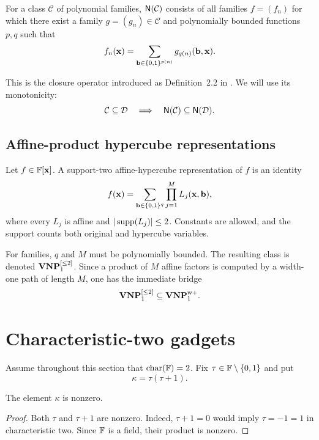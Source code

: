 \begin{definition}\label{def:nclosure}
For a class \(\mathcal C\) of polynomial families, \(\mathsf{N}(\mathcal C)\) consists of all
families \(f=(f_n)\) for which there exist a family \(g=(g_n)\in\mathcal C\) and
polynomially bounded functions \(p,q\) such that
\[
  f_n(\mathbf{x})
   =\sum_{\mathbf{b}\in\{0,1\}^{p(n)}}g_{q(n)}(\mathbf{b},\mathbf{x}).
\]
\end{definition}

This is the closure operator introduced as Definition~2.2 in
\cite{BringmannIkenmeyerZuiddam2018}.  We will use its monotonicity:
\[
  \mathcal C\subseteq\mathcal D
  \quad\Longrightarrow\quad
  \mathsf{N}(\mathcal C)\subseteq\mathsf{N}(\mathcal D).
\]

\subsection{Affine-product hypercube representations}

\begin{definition}\label{def:rep}
Let \(f\in\mathbb{F}[\mathbf{x}]\).  A support-two affine-hypercube representation of \(f\) is an
identity
\[
  f(\mathbf{x})
  =\sum_{\mathbf{b}\in\{0,1\}^q}\prod_{j=1}^{M}L_j(\mathbf{x},\mathbf{b}),
\]
where every \(L_j\) is affine and \(|\operatorname{supp}(L_j)|\le 2\).  Constants are allowed, and the
support counts both original and hypercube variables.
\end{definition}

For families, \(q\) and \(M\) must be polynomially bounded.  The resulting class is denoted
\(\mathbf{VNP}_{1}^{[\le 2]}\).  Since a product of \(M\) affine factors is computed by a width-one path of
length \(M\), one has the immediate bridge
\[
  \mathbf{VNP}_{1}^{[\le 2]}\subseteq\mathbf{VNP}_{1}^{\mathrm{w}+}.
\]

\section{Characteristic-two gadgets}\label{sec:gadgets}

Assume throughout this section that \(\operatorname{char}(\mathbb{F})=2\).  Fix
\(\tau\in\mathbb{F}\setminus\{0,1\}\) and put
\[
  \kappa=\tau(\tau+1).
\]

\begin{lemma}\label{lem:kappa}
The element \(\kappa\) is nonzero.
\end{lemma}

\begin{proof}
Both \(\tau\) and \(\tau+1\) are nonzero.  Indeed, \(\tau+1=0\) would imply
\(\tau=-1=1\) in characteristic two.  Since \(\mathbb{F}\) is a field, their product is nonzero.
\end{proof}

